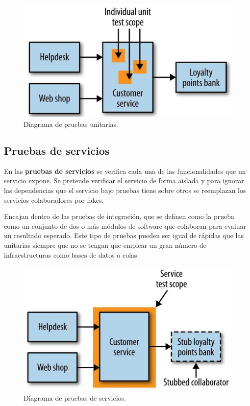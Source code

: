 \documentclass[11pt,spanish,listoffigures]{tfgetsinf}
\begin{document}
\begin{figure}[h]
\centering
\includegraphics[scale=0.5]{Unit_Tests}
\caption{Diagrama de pruebas unitarias.}
\end{figure}

\subsection{Pruebas de servicios}

En las \textbf{pruebas de servicios} se verifica cada una de las funcionalidades que un servicio expone. Se pretende verificar el servicio de forma aislada y para ignorar las dependencias que el servicio bajo pruebas tiene sobre otros se reemplazan los servicios colaboradores por fakes.

Encajan dentro de las pruebas de integración, que se definen como la prueba como un conjunto de dos o más módulos de software que colaboran para evaluar un resultado esperado. \cite{Osherove2014} Este tipo de pruebas pueden ser igual de rápidas que las unitarias siempre que no se tengan que emplear un gran número de infraestructuras como bases de datos o colas.

\begin{figure}[h]
\centering
\includegraphics[scale=0.5]{Service_Tests}
\caption{Diagrama de pruebas de servicios.}
\end{figure}
\end{document}
